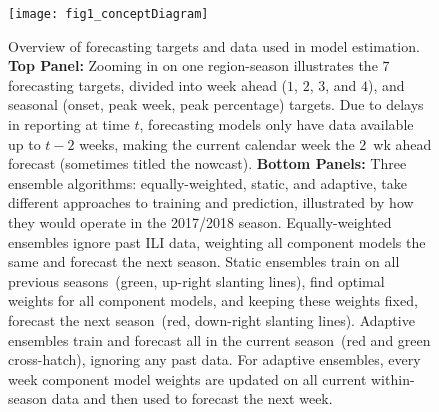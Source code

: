 \documentclass[12pt]{article}
\begin{document}
\graphicspath{{../_6_TLGs/_G/fig1_conceptDiagram/}}
\begin{figure}[ht!]
  \centering
   \texttt{[image: fig1\_conceptDiagram]}
  \caption{
 Overview of forecasting targets and data used in model estimation. {\bf Top Panel:} Zooming in on one region-season illustrates the $7$ forecasting targets, divided into week ahead ($1$, $2$, $3$, and $4$), and seasonal (onset, peak week, peak percentage) targets.
    Due to delays in reporting at time $t$, forecasting models only have data available up to $t-2$ weeks, making the current calendar week the $2$~wk ahead forecast (sometimes titled the nowcast). 
    {\bf Bottom Panels:} Three ensemble algorithms: equally-weighted, static, and adaptive, take different approaches to training and prediction, illustrated by how they would operate in the 2017/2018 season. 
    Equally-weighted ensembles ignore past ILI data, weighting all component models the same and forecast the next season.
    Static ensembles train on all previous seasons~(green, up-right slanting lines), find optimal weights for all component models, and keeping these weights fixed, forecast the next season~(red, down-right slanting lines).
    Adaptive ensembles train and forecast all in the current season~(red and green cross-hatch), ignoring any past data.
    For adaptive ensembles, every week component model weights are updated on all current within-season data and then used to forecast the next week.
    \label{fig1.forecastingConcept}}
\end{figure}
\end{document}
